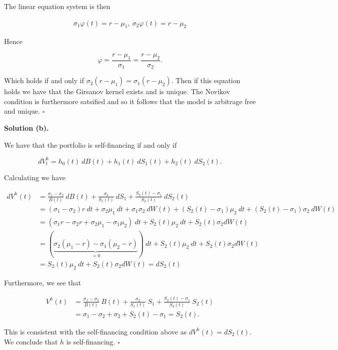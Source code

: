 \documentclass[
]{book}
\begin{document}
The linear equation system is then

\begin{align*}
\sigma_1\varphi(t)=r-\mu_1,\ \sigma_2\varphi(t)=r-\mu_2
\end{align*}

Hence

\[
\varphi=\frac{r-\mu_1}{\sigma_1}=\frac{r-\mu_2}{\sigma_2}.
\]

Which holds if and only if \(\sigma_2(r-\mu_1)=\sigma_1(r-\mu_2)\). Then if this equation holds we have that the Girsanov kernel exists and is unique. The Novikov condition is furthermore satsified and so it follows that the model is arbitrage free and unique. \(\square\)

\noindent\makebox[\linewidth]{\rule{\textwidth}{0.4pt}}

\textbf{Solution (b).}

We have that the portfolio is self-financing if and only if

\[
dV_t^h=h_0(t)\ dB(t)+h_1(t)\ dS_1(t)+h_2(t)\ dS_2(t).
\]

Calculating we have

\begin{align*}
dV^h(t)&=\frac{\sigma_1-\sigma_2}{B(t)}\ dB(t)+\frac{\sigma_2}{S_1(t)}\ dS_1+\frac{S_2(t)-\sigma_1}{S_2(t)}\ dS_2(t)\\
&=(\sigma_1-\sigma_2)r\ dt+\sigma_2\mu_1\ dt+\sigma_1\sigma_2\ dW(t)+(S_2(t)-\sigma_1)\mu_2\ dt+(S_2(t)-\sigma_1)\sigma_2\ dW(t)\\
&=(\sigma_1r-\sigma_2r+\sigma_2\mu_1-\sigma_1\mu_2)\ dt+S_2(t)\mu_2\ dt+S_2(t)\sigma_2dW(t)\\
&=(\underbrace{\sigma_2(\mu_1-r)-\sigma_1(\mu_2-r)}_{=0})\ dt+S_2(t)\mu_2\ dt+S_2(t)\sigma_2dW(t)\\
&=S_2(t)\mu_2\ dt+S_2(t)\sigma_2dW(t)=dS_2(t)
\end{align*}

Furthermore, we see that

\begin{align*}
V^h(t)&=\frac{\sigma_1-\sigma_2}{B(t)}\ B(t)+\frac{\sigma_2}{S_1(t)}\ S_1+\frac{S_2(t)-\sigma_1}{S_2(t)}\ S_2(t)\\
&=\sigma_1-\sigma_2+\sigma_2+S_2(t)-\sigma_1=S_2(t).
\end{align*}

This is consistent with the self-financing condition above as \(dV^h(t)=dS_2(t)\). We conclude that \(h\) is self-financing. \(\square\)

\noindent\makebox[\linewidth]{\rule{\textwidth}{0.4pt}}
\end{document}
